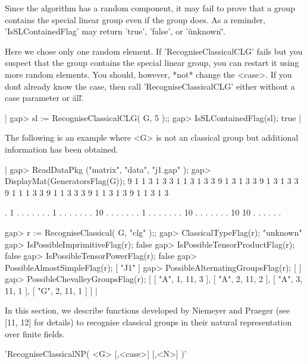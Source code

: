 Since the algorithm has a  random component, it may fail  to prove that a
group contains the special  linear group even  if  the group does.   As a
reminder,    'IsSLContainedFlag'     may  return    'true',  'false',  or
'\"unknown\"'.

Here we chose only one random  element.  If 'RecogniseClassicalCLG' fails
but you suspect that the group contains the special linear group, you can
restart it using more random elements.  You should, however, *not* change
the   <case>.     If you don\'t   already    know  the  case,   then call
'RecogniseClassicalCLG' either without a case parameter or \"all\".

|    gap> sl := RecogniseClassicalCLG( G, 5 );;
    gap> IsSLContainedFlag(sl);
    true |

The following is  an  example where <G>  is  not an classical group   but
additional information has been obtained.

|    gap> ReadDataPkg ("matrix", "data", "j1.gap" );           
    gap> DisplayMat(GeneratorsFlag(G));   
      9  1  1  3  1  3  3
      1  1  3  1  3  3  9
      1  3  1  3  3  9  1
      3  1  3  3  9  1  1
      1  3  3  9  1  1  3
      3  3  9  1  1  3  1
      3  9  1  1  3  1  3
    
      .  1  .  .  .  .  .
      .  .  1  .  .  .  .
      .  .  . 10  .  .  .
      .  .  .  .  1  .  .
      .  .  .  .  . 10  .
      .  .  .  .  .  . 10
     10  .  .  .  .  .  .
    
    gap> r := RecogniseClassical( G, "clg" );;
    gap> ClassicalTypeFlag(r);
    "unknown"
    gap> IsPossibleImprimitiveFlag(r);
    false
    gap> IsPossibleTensorProductFlag(r);
    false
    gap> IsPossibleTensorPowerFlag(r);  
    false
    gap> PossibleAlmostSimpleFlag(r);
    [ "J1" ]
    gap> PossibleAlternatingGroupsFlag(r);     
    [  ]
    gap> PossibleChevalleyGroupsFlag(r);  
    [ [ "A", 1, 11, 3 ], [ "A", 2, 11, 2 ], [ "A", 3, 11, 1 ],
      [ "G", 2, 11, 1 ] ] |

%
%
%
%

In this section, we describe functions developed  by Niemeyer and Praeger
(see [11, 12] for details) to recognise classical groups in their natural
representation over finite fields.

'RecogniseClassicalNP( <G> [,<case>] [,<N>] )'

